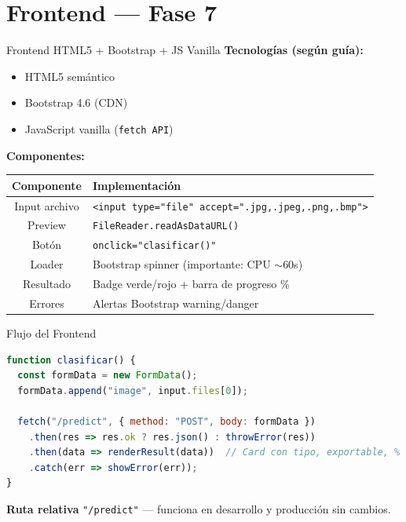 \documentclass[aspectratio=169]{beamer}
\begin{document}
\section{Frontend — Fase 7}

\begin{frame}[fragile]{Frontend HTML5 + Bootstrap + JS Vanilla}
  \textbf{Tecnologías (según guía):}
  \begin{itemize}
    \item HTML5 semántico
    \item Bootstrap 4.6 (CDN)
    \item JavaScript vanilla (\texttt{fetch API})
  \end{itemize}

  \vspace{0.5em}
  \textbf{Componentes:}

  \begin{tabular}{|c|l|}
    \hline
    \textbf{Componente} & \textbf{Implementación} \\
    \hline
    Input archivo & \texttt{<input type="file" accept=".jpg,.jpeg,.png,.bmp">} \\
    Preview & \texttt{FileReader.readAsDataURL()} \\
    Botón & \texttt{onclick="clasificar()"} \\
    Loader & Bootstrap spinner (importante: CPU $\sim$60s) \\
    Resultado & Badge verde/rojo + barra de progreso \% \\
    Errores & Alertas Bootstrap warning/danger \\
    \hline
  \end{tabular}
\end{frame}

\begin{frame}[fragile]{Flujo del Frontend}
  \begin{lstlisting}[language=JavaScript]
function clasificar() {
  const formData = new FormData();
  formData.append("image", input.files[0]);

  fetch("/predict", { method: "POST", body: formData })
    .then(res => res.ok ? res.json() : throwError(res))
    .then(data => renderResult(data))  // Card con tipo, exportable, %
    .catch(err => showError(err));
}
  \end{lstlisting}

  \vspace{0.5em}
  \textbf{Ruta relativa} \texttt{"/predict"} — funciona en desarrollo y producción sin cambios.
\end{frame}
\end{document}
